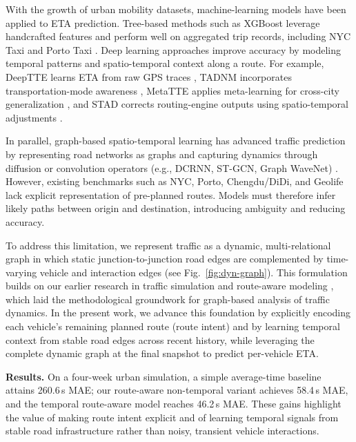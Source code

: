 With the growth of urban mobility datasets, machine-learning models have been applied to ETA prediction. Tree-based methods such as XGBoost \cite{chen2016xgboost} leverage handcrafted features and perform well on aggregated trip records, including NYC Taxi and Porto Taxi \cite{nyc_tlc,moreira2013porto}. Deep learning approaches improve accuracy by modeling temporal patterns and spatio-temporal context along a route. For example, DeepTTE learns ETA from raw GPS traces \cite{deepTTE2018}, TADNM incorporates transportation-mode awareness \cite{xu2020tadnm}, MetaTTE applies meta-learning for cross-city generalization \cite{wang2022metatte}, and STAD corrects routing-engine outputs using spatio-temporal adjustments \cite{abbar2020stad}.

In parallel, graph-based spatio-temporal learning has advanced traffic prediction by representing road networks as graphs and capturing dynamics through diffusion or convolution operators (e.g., DCRNN, ST-GCN, Graph WaveNet) \cite{dcrnn2018,yu2018stgcn,wu2019graphwavenet}. However, existing benchmarks such as NYC, Porto, Chengdu/DiDi, and Geolife \cite{nyc_tlc,moreira2013porto,didi2016,zheng2012geolife} lack explicit representation of pre-planned routes. Models must therefore infer likely paths between origin and destination, introducing ambiguity and reducing accuracy. 

To address this limitation, we represent traffic as a dynamic, multi-relational graph in which static junction-to-junction road edges are complemented by time-varying vehicle and interaction edges (see Fig.~\ref{fig:dyn-graph}). This formulation builds on our earlier research in traffic simulation and route-aware modeling \cite{voloch2021,SmartSimulativeRoute2025}, which laid the methodological groundwork for graph-based analysis of traffic dynamics. In the present work, we advance this foundation by explicitly encoding each vehicle's remaining planned route (route intent) and by learning temporal context from stable road edges across recent history, while leveraging the complete dynamic graph at the final snapshot to predict per-vehicle ETA.

\noindent\textbf{Results.} On a four-week urban simulation, a simple average-time baseline attains 260.6\,s MAE; our route-aware non-temporal variant achieves 58.4\,s MAE, and the temporal route-aware model reaches 46.2\,s MAE. These gains highlight the value of making route intent explicit and of learning temporal signals from stable road infrastructure rather than noisy, transient vehicle interactions.

